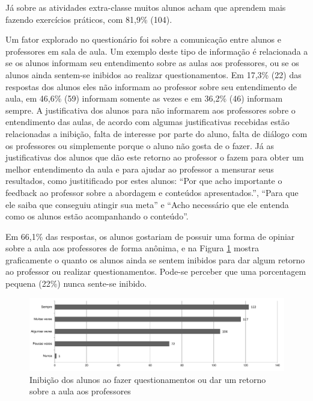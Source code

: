 Já sobre as atividades extra-classe muitos alunos acham que aprendem mais fazendo exercícios práticos, com 81,9\% (104).

Um fator explorado no questionário foi sobre a comunicação entre alunos e professores em sala de aula. Um exemplo deste tipo de informação é relacionada a se os alunos informam seu entendimento sobre as aulas aos professores, ou se os alunos ainda sentem-se inibidos ao realizar questionamentos. Em 17,3\% (22) das respostas dos alunos eles não informam ao professor sobre seu entendimento de aula, em 46,6\% (59) informam somente as vezes e em 36,2\% (46) informam sempre. A justificativa dos alunos para não informarem aos professores sobre o entendimento das aulas, de acordo com algumas justificativas recebidas estão relacionadas a inibição, falta de interesse por parte do aluno, falta de diálogo com os professores ou simplemente porque o aluno não gosta de o fazer. Já as justificativas dos alunos que dão este retorno ao professor o fazem para obter um melhor entendimento da aula e para ajudar ao professor a mensurar seus resultados, como justitificado por estes alunos: ``Por que acho importante o feedback ao professor sobre a abordagem e conteúdos apresentados.'', ``Para que ele saiba que conseguiu atingir sua meta'' e ``Acho necessário que ele entenda como os alunos estão acompanhando o conteúdo''.

Em 66,1\% das respostas, os alunos gostariam de possuir uma forma de opiniar sobre a aula aos professores de forma anônima, e na Figura \ref{fig:grafico_inibido} mostra graficamente o quanto os alunos ainda se sentem inibidos para dar algum retorno ao professor ou realizar questionamentos. Pode-se perceber que uma porcentagem pequena (22\%) nunca sente-se inibido.

\begin{figure}[!h]
\centering
\includegraphics[width=1.0\textwidth]{pdfs/alunos-professores/pesquisa-inibicao-alunos.pdf} 
\caption{Inibição dos alunos ao fazer questionamentos ou dar um retorno sobre a aula aos professores}
\label{fig:grafico_inibido} 
\end{figure}

